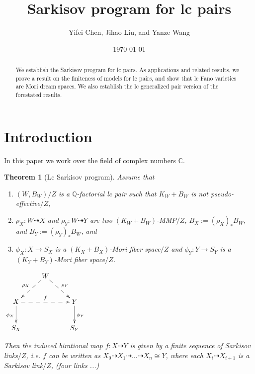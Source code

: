 \documentclass[11pt]{amsart}
\numberwithin{equation}{section}
\newtheorem{thm}{Theorem}[section]
\theoremstyle{definition}
\theoremstyle{definition}
\theoremstyle{definition}
\begin{document}
\title{Sarkisov program for lc pairs}
\author[Y. Chen, J. Liu, and Y. Wang]{Yifei Chen, Jihao Liu, and Yanze Wang}

\date{\today}


\address{Department of Mathematics, Northwestern University, 2033 Sheridan Rd, Evanston, IL 60208}

\begin{abstract}
We establish the Sarkisov program for lc pairs. As applications and related results, we prove a result on the finiteness of models for lc pairs, and show that lc Fano varieties are Mori dream spaces. We also establish the lc generalized pair version of the forestated results.
\end{abstract}

\maketitle
\pagestyle{myheadings}


\tableofcontents

\section{Introduction}
In this paper we work over the field of complex numbers $\mathbb C$.



\begin{thm}[Lc Sarkisov program]\label{thm: lc Sarkisov program}
Assume that
\begin{enumerate}
    \item $(W,B_W)/Z$ is a $\mathbb{Q}$-factorial lc pair such that $K_W+B_W$ is not pseudo-effective$/Z$,
    \item $\rho_X: W\dashrightarrow X$ and $\rho_Y: W\dashrightarrow Y$ are two $(K_W+B_W)$-MMP$/Z$, $B_X:=(\rho_X)_*B_W$, and $B_Y:=(\rho_Y)_*B_W$, and
    \item $\phi_X: X\rightarrow S_X$ is a $(K_X+B_X)$-Mori fiber space$/Z$ and $\phi_Y: Y\rightarrow S_Y$ is a $(K_Y+B_Y)$-Mori fiber space$/Z$.
\end{enumerate}
\begin{center}$\xymatrix{
 & W\ar@{-->}[dl]_{\rho_X}\ar@{-->}[dr]^{\rho_Y}& \\
      X \ar@{->}[d]_{\phi_X}\ar@{-->}[rr]^{f}   &  & Y\ar@{->}[d]^{\phi_Y} \\
    S_X & &S_Y }$
\end{center}
Then the induced birational map $f: X\dashrightarrow Y$ is given by a finite sequence of Sarkisov links$/Z$, i.e. $f$ can be written as $X_0\dashrightarrow X_1\dashrightarrow\dots\dashrightarrow X_n\cong Y$, where each $X_{i}\dashrightarrow X_{i+1}$ is a Sarkisov link$/Z$, (four links ...)
\end{thm}
\end{document}

